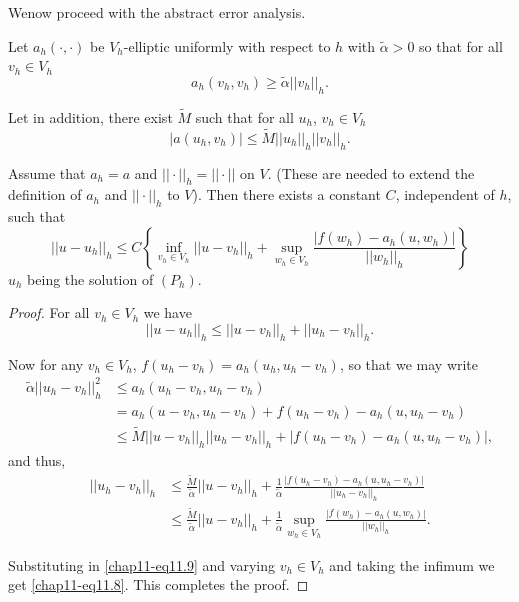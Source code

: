 We\pageoriginale now proceed with the abstract error analysis.

\begin{theorem}[STRANG]\label{chap11-thm11.1}
Let $a_{h}(\cdot,\cdot)$ be $V_{h}$-elliptic uniformly with respect to
$h$ with $\widetilde{\alpha}>0$ so that for all $v_{h}\in V_{h}$
\begin{equation*}
a_{h}(v_{h},v_{h})\geq
\widetilde{\alpha}||v_{h}||_{h}.\tag{11.6}\label{chap11-eq11.6} 
\end{equation*}

Let in addition, there exist $\widetilde{M}$ such that for all $u_{h}$,
$v_{h}\in V_{h}$
\begin{equation*}
|a(u_{h},v_{h})|\leq
\widetilde{M}||u_{h}||_{h}||v_{h}||_{h}.\tag{11.7}\label{chap11-eq11.7} 
\end{equation*}

Assume that $a_{h}=a$ and $||\cdot||_{h}=||\cdot||$ on $V$. (These are
needed to extend the definition of $a_{h}$ and $||\cdot||_{h}$ to
$V$). Then there exists a constant $C$, independent of $h$, such that
\begin{equation*}
||u - u_{h}||_{h}\leq C\left\{\inf\limits_{v_{h}\in
  V_{h}}||u-v_{h}||_{h}+\sup\limits_{w_{h}\in
V_{h}}\frac{|f(w_{h})-a_{h}(u,w_{h})|}{||w_{h}||_{h}}\right\}\tag{11.8}\label{chap11-eq11.8} \end{equation*}
$u_{h}$ being the solution of $(P_{h})$.
\end{theorem}

\begin{proof}
For all $v_{h}\in V_{h}$ we have
\begin{equation*}
||u-u_{h}||_{h}\leq ||
u-v_{h}||_{h}+||u_{h}-v_{h}||_{h}.\tag{11.9}\label{chap11-eq11.9} 
\end{equation*}

Now for any $v_{h}\in V_{h}$,
$f(u_{h}-v_{h})=a_{h}(u_{h},u_{h}-v_{h})$, so that we may write
\begin{align*}
\widetilde{\alpha}||u_{h}-v_{h}||^{2}_{h} &\leq
a_{h}(u_{h}-v_{h},u_{h}-v_{h})\\
&= a_{h}(u-v_{h},u_{h}-v_{h})+f(u_{h}-v_{h})-a_{h}(u,u_{h}-v_{h})\\
&\leq
\widetilde{M}||u-v_{h}||_{h}||u_{h}-v_{h}||_{h}+|f(u_{h}-v_{h})-a_{h}(u,u_{h}-v_{h})|, 
\end{align*}
and thus,
\begin{align*}
||u_{h}-v_{h}||_{h} &\leq
\frac{\widetilde{M}}{\widetilde{\alpha}}||u-v_{h}||_{h}+\frac{1}{\widetilde{\alpha}}\frac{|f(u_{h}-v_{h})-a_{h}(u,u_{h}-v_{h})|}{||u_{h}-v_{h}||_{h}}\\
&\leq
\frac{\widetilde{M}}{\widetilde{\alpha}}||u-v_{h}||_{h}+\frac{1}{\widetilde{\alpha}}\sup\limits_{w_{h}\in
  V_{h}}\frac{|f(w_{h})-a_{h}(u,w_{h})|}{||w_{h}||_{h}}. 
\end{align*}\pageoriginale

Substituting in \eqref{chap11-eq11.9} and varying $v_{h}\in V_{h}$ and
taking the infimum we get \eqref{chap11-eq11.8}. This completes the
proof. 
\end{proof}

